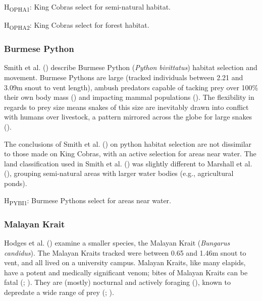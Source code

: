\documentclass[10pt,a4paper]{article}
\begin{document}
H\textsubscript{OPHA1}: King Cobras select for semi-natural habitat.

H\textsubscript{OPHA2}: King Cobras select for forest habitat.

\subsubsection{Burmese Python}\label{burmese-python}

Smith et al. () describe Burmese Python (\emph{Python bivittatus}) habitat selection and movement.
Burmese Pythons are large (tracked individuals between 2.21 and 3.09m snout to vent length), ambush predators capable of tacking prey over 100\% their own body mass () and impacting mammal populations ().
The flexibility in regards to prey size means snakes of this size are inevitably drawn into conflict with humans over livestock, a pattern mirrored across the globe for large snakes ().

The conclusions of Smith et al. () on python habitat selection are not dissimilar to those made on King Cobras, with an active selection for areas near water.
The land classification used in Smith et al. () was slightly different to Marshall et al. (), grouping semi-natural areas with larger water bodies (e.g., agricultural ponds).

H\textsubscript{PYBI1}: Burmese Pythons select for areas near water.

\subsubsection{Malayan Krait}\label{malayan-krait}

Hodges et al. () examine a smaller species, the Malayan Krait (\emph{Bungarus candidus}).
The Malayan Kraits tracked were between 0.65 and 1.46m snout to vent, and all lived on a university campus.
Malayan Kraits, like many elapids, have a potent and medically significant venom; bites of Malayan Kraits can be fatal (; ).
They are (mostly) nocturnal and actively foraging (), known to depredate a wide range of prey (; ).
\end{document}

